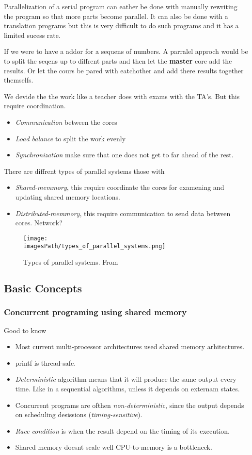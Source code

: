 Parallelization of a serial program can eather be done with manually rewriting the program so that more parts become parallel. It can also be done with a translation programs but this is very difficult to do such programs and it has a limited sucess rate.

If we were to have a addor for a sequens of numbers. A parralel approch would be to split the seqens up to diffrent parts and then let the \textbf{master} core add the results. Or let the cours be pared with eatchother and add there results together themselfs.

We devide the the work like a teacher does with exams with the TA's. But this require coordination.
\begin{itemize}
  \item \textit{Communication} between the cores
  \item \textit{Load balance} to split the work evenly
  \item \textit{Synchronization} make sure that one does not get to far ahead of the rest.
\end{itemize}

There are diffrent types of parallel systems those with
\begin{itemize}
  \item \textit{Shared-memmory}, this require coordinate the cores for examening and updating shared memory locations.
  \item \textit{Distributed-memmory}, this require communication to send data between cores. Network?
\end{itemize}

\begin{figure}[!ht]
    \centering
    \texttt{[image: \\imagesPath/types\_of\_parallel\_systems.png]}
    \caption{Types of parallel systems. From~\cite{}}
\end{figure}

\subsection{Basic Concepts}
\subsubsection{Concurrent programing using shared memory}
Good to know
\begin{itemize}
\item Most current multi-processor architectures used shared memory arhitectures.
\item printf is thread-safe.
\item \textit{Deterministic} algorithm means that it will produce the same output every time. Like in a sequential algorithms, unless it depends on externam states.
\item Concurrent programs are ofthen \textit{non-deterministic}, since the output depends on scheduling desissions (\textit{timing-sensitive}).
\item \textit{Race condition} is when the result depend on the timing of its execution.
\item Shared memory doesnt scale well CPU-to-memory is a bottleneck.
\end{itemize}
  

